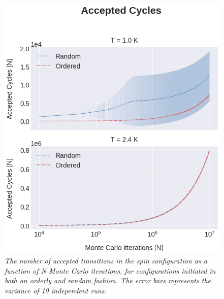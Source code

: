 \documentclass[%
reprint,nofootinbib,
amsmath,amssymb,
aps,
]{revtex4-1}
\begin{document}
     

\newpage 
\begin{figure}[H]
	\includegraphics[width = \columnwidth]{Figures/Plot2.png} 
	\caption{\label{4C2} \textit{The number of accepted transitions in the spin configuration as a function of N Monte Carlo iterations, for configurations initiated in both an orderly and random fashion. The error bars represents the variance of 10 independent runs.} \vspace{10mm}
	}
\end{figure} 
\end{document}
